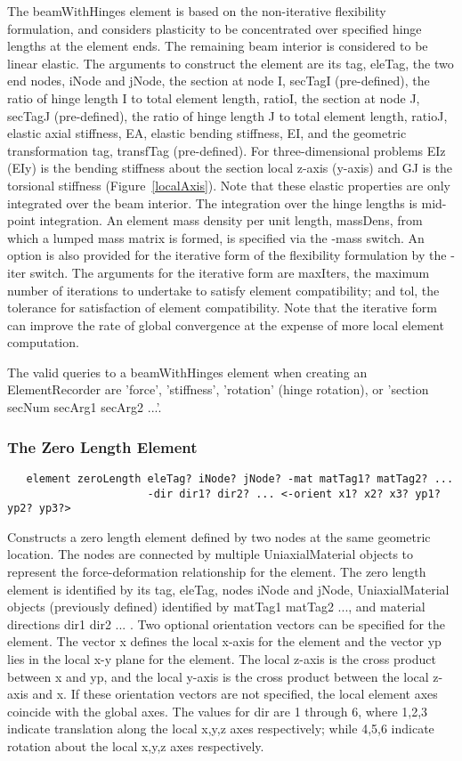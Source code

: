 \documentclass[12pt]{article}
\begin{document}
\noindent The beamWithHinges element is based on the non-iterative flexibility
formulation, and considers plasticity to be concentrated over
specified hinge lengths at the element ends. The remaining beam
interior is considered to be linear elastic. The arguments to
construct the element are its tag, eleTag, the two end nodes, iNode
and jNode, the section at node I, secTagI (pre-defined), the ratio of
hinge length I to total element length, ratioI, the section at node J,
secTagJ (pre-defined), the ratio of hinge length J to total element
length, ratioJ, elastic axial stiffness, EA, elastic bending
stiffness, EI, and the geometric transformation tag, transfTag
(pre-defined). For three-dimensional problems EIz (EIy) is the bending
stiffness about the section local z-axis (y-axis) and GJ is the
torsional stiffness (Figure~\ref{localAxis}). Note that these elastic
properties are only integrated over the beam interior. The integration
over the hinge lengths is mid-point integration. An element mass
density per unit length, massDens, from which a lumped mass matrix 
is formed, is specified via the -mass switch. An option is also
provided for the iterative form of the flexibility formulation by the
-iter switch. The arguments for the iterative form are maxIters, the
maximum number of iterations to undertake to satisfy element
compatibility; and tol, the tolerance for satisfaction of element
compatibility. Note that the iterative form can improve the rate of
global convergence at the expense of more local element computation. 

The valid queries to a beamWithHinges element when creating an
ElementRecorder are 'force', 'stiffness', 'rotation' (hinge rotation),
or 'section secNum secArg1 secArg2 ...'. 

\subsubsection{The Zero Length Element}
{\sf\small
\begin{verbatim}
   element zeroLength eleTag? iNode? jNode? -mat matTag1? matTag2? ...
                      -dir dir1? dir2? ... <-orient x1? x2? x3? yp1? yp2? yp3?>
\end{verbatim}
}

\noindent Constructs a zero length element defined by two nodes at the
same geometric location. The nodes are connected by multiple
UniaxialMaterial objects to represent the force-deformation
relationship for the element. The zero length element is identified
by its tag, eleTag, nodes iNode and jNode, UniaxialMaterial objects
(previously defined) identified by matTag1 matTag2 ..., and material
directions dir1 dir2 ... . Two optional orientation vectors can be
specified for the element. The vector x defines the local x-axis for
the element and the vector yp lies in the local x-y plane for the
element. The local z-axis is the cross product between x and yp, and
the local y-axis is the cross product between the local z-axis and x.
If these orientation vectors are not specified, the local element axes
coincide with the global axes. The values for dir are 1 through 6,
where 1,2,3 indicate translation along the local x,y,z axes
respectively; while 4,5,6 indicate rotation about the local x,y,z axes
respectively. 
\end{document}
